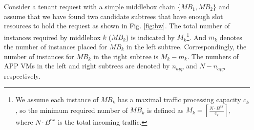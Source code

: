 \documentclass[review]{elsarticle}
\begin{document}
Consider a tenant request with a simple middlebox chain $\{MB_1, MB_2\}$ and assume that we have found two candidate subtrees that have enough slot resources to hold the request 
as shown in Fig. \ref{fig:bw}. %
The total number of instances required by middlebox $k$ ($MB_k$) is indicated by $M_k$\footnote{We assume each instance of $MB_k$ has a maximal traffic processing capacity $c_k$, so the minimum required number of $MB_k$ is defined as 
	$M_{k}={\left\lceil\frac{N \cdot B^{ex}}{c_{k}}\right\rceil}$,
	where $N\cdot B^{ex}$ is the total incoming traffic.}. And $m_k$ denotes the number of instances placed for $MB_k$  in the left subtree. %
 Correspondingly, the number of instances for $MB_k$ in the right subtree is $M_k-m_k$. The numbers of APP VMs in the left and right subtrees are denoted by $n_{app}$ and $N-n_{app}$ respectively. %
\end{document}

